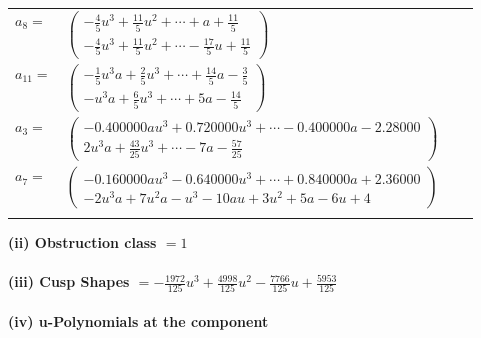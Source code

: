 \documentclass[1p]{elsarticle_modified}
\theoremstyle{definition}
\begin{document}
\begin{tabular}{m{7pt} m{180pt} m{7pt} m{180pt} }
\flushright $a_{8}=$&$\begin{pmatrix}-\frac{4}{5} u^3+\frac{11}{5} u^2+\cdots+a+\frac{11}{5}\\-\frac{4}{5} u^3+\frac{11}{5} u^2+\cdots-\frac{17}{5} u+\frac{11}{5}\end{pmatrix}$ \\
\flushright $a_{11}=$&$\begin{pmatrix}-\frac{1}{5} u^3 a+\frac{2}{5} u^3+\cdots+\frac{14}{5} a-\frac{3}{5}\\- u^3 a+\frac{6}{5} u^3+\cdots+5 a-\frac{14}{5}\end{pmatrix}$ \\
\flushright $a_{3}=$&$\begin{pmatrix}-0.400000 a u^{3}+0.720000 u^{3}+\cdots-0.400000 a-2.28000\\2 u^3 a+\frac{43}{25} u^3+\cdots-7 a-\frac{57}{25}\end{pmatrix}$ \\
\flushright $a_{7}=$&$\begin{pmatrix}-0.160000 a u^{3}-0.640000 u^{3}+\cdots+0.840000 a+2.36000\\-2 u^3 a+7 u^2 a- u^3-10 a u+3 u^2+5 a-6 u+4\end{pmatrix}$\\&\end{tabular}
\flushleft \textbf{(ii) Obstruction class $= 1$}\\~\\
\flushleft \textbf{(iii) Cusp Shapes $= -\frac{1972}{125} u^3+\frac{4998}{125} u^2-\frac{7766}{125} u+\frac{5953}{125}$}\\~\\
\newpage\renewcommand{\arraystretch}{1}
\flushleft \textbf{(iv) u-Polynomials at the component}\newline \\
\end{document}
